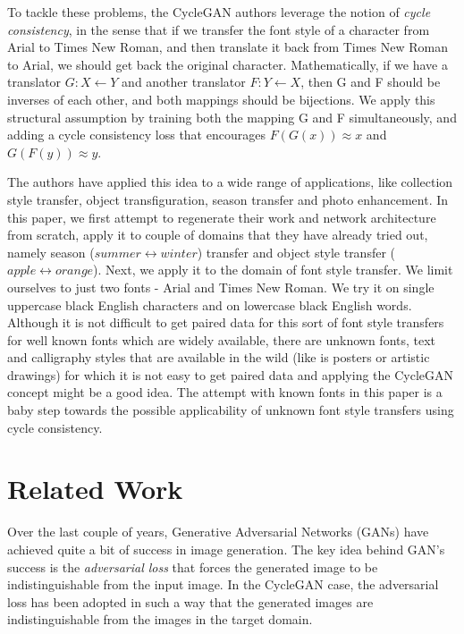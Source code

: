 \documentclass[10pt,twocolumn,letterpaper]{article}
\begin{document}
To tackle these problems, the CycleGAN \cite{cyclegan} authors leverage the notion of \textit{cycle consistency}, in the sense that if we transfer the font style of a character from Arial to Times New Roman, and then translate it back from Times New Roman to Arial, we should get back the original character. Mathematically, if we have a translator $G : X \leftarrow Y$ and another translator $F: Y \leftarrow X$, then G and F should be inverses of each other, and both mappings should be bijections. We apply this structural assumption by training both the mapping G and F simultaneously, and adding a cycle consistency loss \cite{rel21} that encourages $F(G(x)) \approx x$ and $G(F(y)) \approx y$.

The authors \cite{cyclegan} have applied this idea to a wide range of
applications, like collection style transfer, object transfiguration, season
transfer and photo enhancement. In this paper, we first attempt to regenerate
their work and network architecture from scratch, apply it to couple of domains 
that they have already tried out, namely season ($summer \leftrightarrow winter$) 
transfer and object style transfer ($apple \leftrightarrow orange$). Next, we apply 
it to the domain of font style transfer. We limit ourselves to just two fonts - Arial and 
Times New Roman. We try it on single uppercase black English characters and on 
lowercase black English words. Although it is not difficult to get paired data for this 
sort of font style transfers for well known fonts which are widely available, there are 
unknown fonts, text and calligraphy styles that are available in the wild (like is posters or artistic
drawings) for which it is 
not easy to get paired data and applying the CycleGAN concept might be a good idea. 
The attempt with known fonts in this paper is a baby step towards the possible 
applicability of unknown font style transfers using cycle consistency.

\section{Related Work}
Over the last couple of years, Generative Adversarial Networks (GANs) \cite{gan1, gan2} have achieved
quite a bit of success in image generation. The key idea behind GAN's success is the \textit{adversarial 
loss} that forces the generated image to be indistinguishable from the input image. In the CycleGAN case,
the adversarial loss has been adopted in such a way that the generated images are indistinguishable from 
the images in the target domain.
\end{document}
